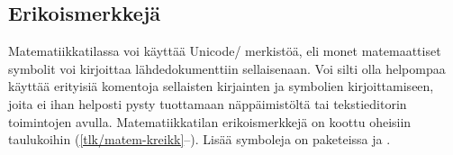 \subsection{Erikoismerkkejä}

Matematiikkatilassa voi käyttää Unicode\-/ merkistöä, eli monet
matemaattiset symbolit voi kirjoittaa lähdedokumenttiin sellaisenaan.
Voi silti olla helpompaa käyttää erityisiä komentoja sellaisten
kirjainten ja symbolien kirjoittamiseen, joita ei ihan helposti pysty
tuottamaan näppäimistöltä tai tekstieditorin toimintojen avulla.
Matematiikkatilan erikoismerkkejä on koottu oheisiin taulukoihin
(\ref{tlk/matem-kreikk}--). Lisää symboleja on paketeissa
 ja .

